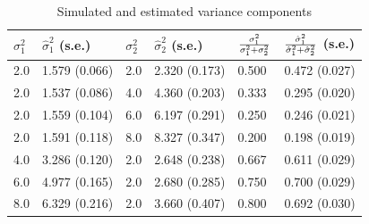 \documentclass{scrartcl}
\begin{document}
\begin{table}[htb]
        \centering
        \begin{tabular}{| l | l | l | l | l | l |}
                \hline
                $\sigma_1^2$ & $\hat{\sigma}_1^2$ (s.e.) & $\sigma_2^2$ & $\hat{\sigma}_2^2$ (s.e.) & $\sigma_1^2 \over {\sigma_1^2+\sigma_2^2}$ & $\hat{\sigma}_1^2 \over {\hat{\sigma}_1^2+\hat{\sigma}_2^2}$ (s.e.) \\ \hline
                2.0 & 1.579 (0.066) & 2.0 & 2.320 (0.173) & 0.500 & 0.472 (0.027) \\ \hline                
                2.0 & 1.537 (0.086) & 4.0 & 4.360 (0.203) & 0.333 & 0.295 (0.020) \\ \hline
                2.0 & 1.559 (0.104) & 6.0 & 6.197 (0.291) & 0.250 & 0.246 (0.021) \\ \hline
                2.0 & 1.591 (0.118) & 8.0 & 8.327 (0.347) & 0.200 & 0.198 (0.019) \\ \hline        
                4.0 & 3.286 (0.120) & 2.0 & 2.648 (0.238) & 0.667 & 0.611 (0.029) \\ \hline        
                6.0 & 4.977 (0.165) & 2.0 & 2.680 (0.285) & 0.750 & 0.700 (0.029) \\ \hline        
                8.0 & 6.329 (0.216) & 2.0 & 3.660 (0.407) & 0.800 & 0.692 (0.030) \\ \hline        
        \end{tabular}
        \caption{Simulated and estimated variance components}
        \label{tbl:param_est}
\end{table}
\end{document}
